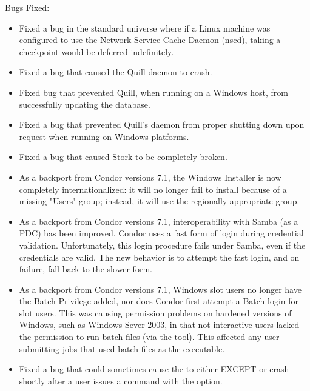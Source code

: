 \noindent Bugs Fixed:

\begin{itemize}

\item Fixed a bug in the standard universe where if a Linux machine was
  configured to use the Network Service Cache Daemon (nscd), taking
  a checkpoint would be deferred indefinitely.

\item Fixed a bug that caused the Quill daemon to crash.

\item Fixed bug that prevented Quill, when running on a
  Windows host, from successfully updating the database.

\item Fixed a bug that prevented Quill's  daemon from proper
  shutting down upon request when running on Windows platforms.

\item Fixed a bug that caused Stork to be completely broken.

\item As a backport from Condor versions 7.1,
  the Windows Installer is now completely
  internationalized: it will no longer fail to install because of a
  missing "Users" group; instead, it will use the regionally appropriate
  group.

\item As a backport from Condor versions 7.1,
  interoperability with Samba (as a PDC) has been improved.
  Condor uses a fast form of login during credential validation.
  Unfortunately, this login procedure fails under Samba,
  even if the credentials are valid.  The new behavior is to attempt
  the fast login, and on failure, fall back to the slower form.

\item As a backport from Condor versions 7.1,
  Windows slot users no longer have the
  Batch Privilege added, nor does Condor first attempt a Batch login
  for slot users.  This was causing permission problems on hardened
  versions of Windows, such as Windows Sever 2003, in that not
  interactive users lacked the permission to run batch files 
  (via the  tool). 
  This affected any user submitting jobs that used
  batch files as the executable.

\item Fixed a bug that could sometimes cause the 
  to either EXCEPT or crash shortly after a user issues a 
  command with the  option.


\end{itemize}
